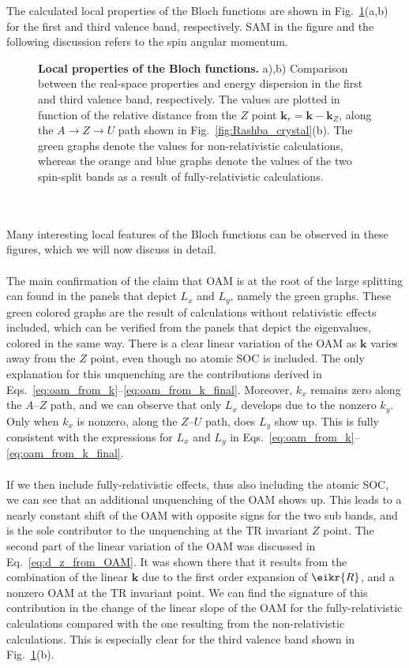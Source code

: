 The calculated local properties of the Bloch functions are shown in Fig.~\ref{fig:Rashba_oamvseigvalv}(a,b) for the first and third valence band, respectively. SAM in the figure and the following discussion refers to the spin angular momentum.
\begin{figure}
	\centering
{}
\caption{\label{fig:Rashba_oamvseigvalv}{\bf Local properties of the Bloch functions.} a),b) Comparison between the real-space properties and energy dispersion in the first and third valence band, respectively. The values are plotted in function of the relative distance from the $Z$ point $\bm{k}_r = \bm{k} - \bm{k}_Z$, along the $A \rightarrow Z \rightarrow U$ path shown in Fig.~\ref{fig:Rashba_crystal}(b). The green graphs denote the values for non-relativistic calculations, whereas the orange and blue graphs denote the values of the two spin-split bands as a result of fully-relativistic calculations.}
\end{figure}
\\\\
Many interesting local features of the Bloch functions can be observed in these figures, which we will now discuss in detail.
\\\\
The main confirmation of the claim that OAM is at the root of the large splitting can found in the panels that depict $L_x$ and $L_y$, namely the green graphs. These green colored graphs are the result of calculations without relativistic effects included, which can be verified from the panels that depict the eigenvalues, colored in the same way.
There is a clear linear variation of the OAM as $\bm k$ varies away from the $Z$ point, even though no atomic SOC is included.
The only explanation for this unquenching are the contributions derived in Eqs.~\eqref{eq:oam_from_k}--\eqref{eq:oam_from_k_final}.
Moreover, $k_x$ remains zero along the $A$--$Z$ path, and we can observe that only $L_x$ develops due to the nonzero $k_y$. Only when $k_x$ is nonzero, along the $Z$--$U$ path, does $L_y$ show up. This is fully consistent with the expressions for $L_x$ and $L_y$ in Eqs.~\eqref{eq:oam_from_k}--\eqref{eq:oam_from_k_final}.
\\\\
If we then include fully-relativistic effects, thus also including the atomic SOC, we can see that an additional unquenching of the OAM shows up.
This leads to a nearly constant shift of the OAM with opposite signs for the two sub bands, and is the sole contributor to the unquenching at the TR invariant $Z$ point.
The second part of the linear variation of the OAM was discussed in Eq.~\eqref{eq:d_z_from_OAM}. It was shown there that it results from the combination of the linear $\bm k$ due to the first order expansion of $\eikr{R}$, and a nonzero OAM at the TR invariant point.
We can find the signature of this contribution in the change of the linear slope of the OAM for the fully-relativistic calculations compared with the one resulting from the non-relativistic calculations.
This is especially clear for the third valence band shown in Fig.~\ref{fig:Rashba_oamvseigvalv}(b).


